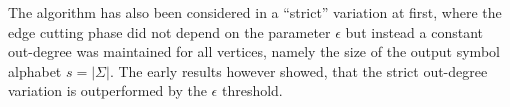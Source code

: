 The algorithm has also been considered in a ``strict'' variation at first, where the edge cutting phase did not depend on the parameter $\epsilon$ but instead a constant out-degree was maintained for all vertices, namely the size of the output symbol alphabet $s = |\Sigma|$. The early results however showed, that the strict out-degree variation is outperformed by the $\epsilon$ threshold.